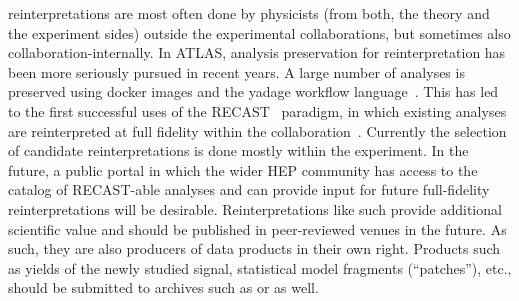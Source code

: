 \documentclass[11pt]{article}
\begin{document}

\Glspl{reinterpretation} are most often done by physicists (from both, the theory and the experiment sides) outside the experimental collaborations, but sometimes also collaboration-internally. 
In \gls{ATLAS}, \gls{analysis preservation} for reinterpretation has been more seriously pursued in recent years. A large number of analyses is preserved using docker images and the yadage workflow language~\cite{Cranmer:2017frf,Cranmer_2015}. This has led to the first successful uses of the RECAST~\cite{Cranmer:2010hk} paradigm, in which existing analyses are reinterpreted at full fidelity within the collaboration~\cite{RECAST1, RECAST2, RECAST3}. Currently the selection of candidate reinterpretations  is done mostly within the experiment. In the future, a public portal in which the wider \gls{HEP} community has access to the catalog of RECAST-able analyses and can provide input for future full-fidelity reinterpretations will be desirable. Reinterpretations like such provide additional scientific value and should be published in peer-reviewed venues in the future. As such, they are also producers of \glspl{data product} in their own right. Products such as yields of the newly studied signal, statistical model fragments (``patches''), etc., should be submitted to archives such as \hepdata or \zenodo as well.
\end{document}
